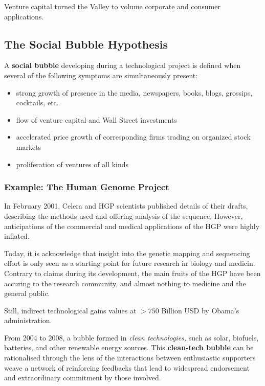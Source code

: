 \documentclass[a4paper]{extarticle}
\begin{document}
Venture capital turned the Valley to volume corporate and consumer applications.

\subsection{The Social Bubble Hypothesis}

A \textbf{social bubble} developing during a technological project is defined when several of the following symptoms are simultaneously present:

\begin{itemize}
    \item strong growth of presence in the media, newspapers, books, blogs, grossips, cocktails, etc.
    \item flow of venture capital and Wall Street investments
    \item accelerated price growth of corresponding firms trading on organized stock markets
    \item proliferation of ventures of all kinds
\end{itemize}

\subsubsection{Example: The Human Genome Project}

In February 2001, Celera and HGP scientists published details of their drafts, describing the methods used and offering analysis of the sequence. However, anticipations of the commercial and medical applications of the HGP were highly inflated.

Today, it is acknowledge that insight into the genetic mapping and sequencing effort is only seen as a starting point for future research in biology and medicin. Contrary to claims during its development, the main fruits of the HGP have been accuring to the research community, and almost nothing to medicine and the general public.

Still, indirect technological gains values at $> 750$ Billion USD by Obama's administration.

From 2004 to 2008, a bubble formed in \textit{clean technologies,} such as solar, biofuels, batteries, and other renewable energy sources. This \textbf{clean-tech bubble} can be rationalised through the lens of the interactions between enthusiastic supporters weave a network of reinforcing feedbacks that lead to widespread endorsement and extraordinary commitment by those involved.
\end{document}
